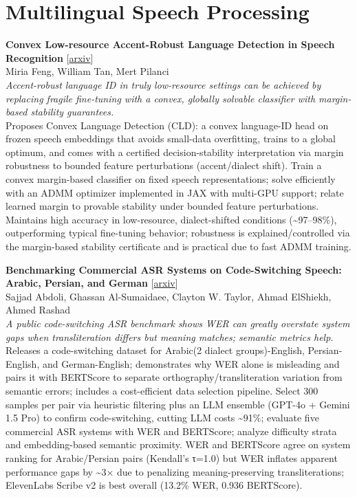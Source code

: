 \documentclass[12pt,letterpaper]{article}
\begin{document}
\medskip


\section*{Multilingual Speech Processing}

{\small\textbf{Convex Low-resource Accent-Robust Language Detection in Speech Recognition}} {\scriptsize[\href{https://arxiv.org/abs/2605.23235}{arxiv}]}\\
{\scriptsize Miria Feng, William Tan, Mert Pilanci}\\

{\small\textit{Accent-robust language ID in truly low-resource settings can be achieved by replacing fragile fine-tuning with a convex, globally solvable classifier with margin-based stability guarantees.}}\\[1pt]
{\footnotesize Proposes Convex Language Detection (CLD): a convex language-ID head on frozen speech embeddings that avoids small-data overfitting, trains to a global optimum, and comes with a certified decision-stability interpretation via margin robustness to bounded feature perturbations (accent/dialect shift). Train a convex margin-based classifier on fixed speech representations; solve efficiently with an ADMM optimizer implemented in JAX with multi-GPU support; relate learned margin to provable stability under bounded feature perturbations. Maintains high accuracy in low-resource, dialect-shifted conditions (\textasciitilde{}97--98\%), outperforming typical fine-tuning behavior; robustness is explained/controlled via the margin-based stability certificate and is practical due to fast ADMM training.}

\medskip

{\small\textbf{Benchmarking Commercial ASR Systems on Code-Switching Speech: Arabic, Persian, and German}} {\scriptsize[\href{https://arxiv.org/abs/2605.19069}{arxiv}]}\\
{\scriptsize Sajjad Abdoli, Ghassan Al-Sumaidaee, Clayton W. Taylor, Ahmad ElShiekh, Ahmed Rashad}\\

{\small\textit{A public code-switching ASR benchmark shows WER can greatly overstate system gaps when transliteration differs but meaning matches; semantic metrics help.}}\\[1pt]
{\footnotesize Releases a code-switching dataset for Arabic(2 dialect groups)-English, Persian-English, and German-English; demonstrates why WER alone is misleading and pairs it with BERTScore to separate orthography/transliteration variation from semantic errors; includes a cost-efficient data selection pipeline. Select 300 samples per pair via heuristic filtering plus an LLM ensemble (GPT-4o + Gemini 1.5 Pro) to confirm code-switching, cutting LLM costs \textasciitilde{}91\%; evaluate five commercial ASR systems with WER and BERTScore; analyze difficulty strata and embedding-based semantic proximity. WER and BERTScore agree on system ranking for Arabic/Persian pairs (Kendall's τ=1.0) but WER inflates apparent performance gaps by \textasciitilde{}3× due to penalizing meaning-preserving transliterations; ElevenLabs Scribe v2 is best overall (13.2\% WER, 0.936 BERTScore).}
\end{document}
